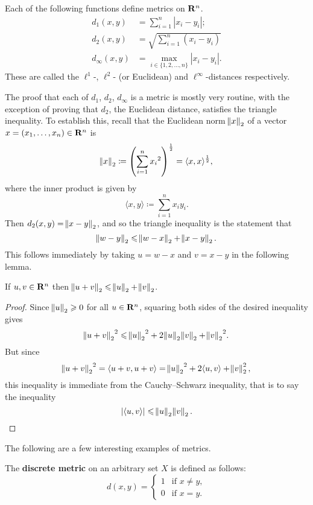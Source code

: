 \begin{example}[Metrics on $\RR^n$]
Each of the following functions define metrics on $\RR^n$.
\begin{align*}
d_1(x,y)&=\sum_{i=1}^{n}|x_i-y_i|;\\
d_2(x,y)&=\sqrt{\sum_{i=1}^{n}(x_i-y_i)}\\
d_\infty(x,y)&=\max_{i\in\{1,2,\dots,n\}}|x_i-y_i|.
\end{align*}
These are called the $\ell^1$-, $\ell^2$- (or Euclidean) and $\ell^\infty$-distances respectively.

The proof that each of $d_1$, $d_2$, $d_\infty$ is a metric is mostly very routine, with the exception of proving that $d_2$, the Euclidean distance, satisfies the triangle inequality. To establish this, recall that the Euclidean norm $\norm{x}_2$ of a vector $x=(x_1,\dots,x_n)\in\mathbf R^n$ is
\[\norm{x}_2\coloneqq\left(\sum_{i=1}^n{x_i}^2\right)^\frac{1}{2}=\langle x,x\rangle^\frac{1}{2},\]
where the inner product is given by
\[\langle x,y\rangle\coloneqq\sum_{i=1}^{n}x_i y_i.\]
Then $d_2(x,y)=\norm{x-y}_2$, and so the triangle inequality is the statement that
\[\norm{w-y}_2\leqslant\norm{w-x}_2+\norm{x-y}_2.\]
This follows immediately by taking $u=w-x$ and $v=x-y$ in the following lemma.

\begin{lemma}
If $u,v\in\mathbf R^n$ then $\norm{u+v}_2\leqslant\norm{u}_2+\norm{v}_2$.
\end{lemma}

\begin{proof}
Since $\norm{u}_2\geqslant0$ for all $u\in\mathbf R^n$, squaring both sides of the desired inequality gives
\[{\norm{u+v}_2}^2\leqslant{\norm{u}_2}^2+2\norm{u}_2\norm{v}_2+{\norm{v}_2}^2.\]
But since
\[{\norm{u+v}_2}^2=\langle u+v,u+v\rangle={\norm{u}_2}^2+2\langle u,v\rangle+\norm{v}_2^2,\]
this inequality is immediate from the Cauchy--Schwarz inequality, that is to say the inequality
\[|\langle u,v\rangle|\leqslant\norm{u}_2\norm{v}_2.\]
\end{proof}
\end{example}

The following are a few interesting examples of metrics.

\begin{example}
The \textbf{discrete metric} on an arbitrary set $X$ is defined as follows:
\[d(x,y)=\begin{cases}
1&\text{if }x\neq y,\\
0&\text{if }x=y.
\end{cases}\]
\end{example}

